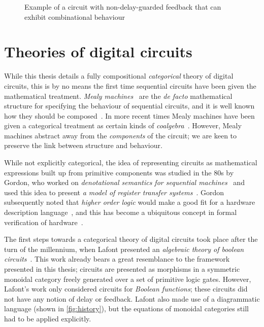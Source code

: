 \begin{figure}
    \centering
    \caption{
        Example of a circuit with non-delay-guarded feedback that can
        exhibit combinational behaviour~\cite{malik1994analysis}
    }
    \label{fig:cyclic}
\end{figure}

\section{Theories of digital circuits}

While this thesis details a fully compositional
\emph{categorical} theory of digital circuits, this is by no means the first
time sequential circuits have been given the mathematical treatment.
\emph{Mealy machines}~\cite{mealy1955method} are the \emph{de facto}
mathematical structure for specifying the behaviour of sequential circuits, and
it is well
known how they should be composed~\cite{ginzburg2014algebraic}.
In more recent times Mealy machines have been given a categorical treatment as
certain kinds of \emph{coalgebra}~\cite{rutten2006algebraic,bonsangue2008coalgebraic}.
However, Mealy machines abstract away from the \emph{components} of the circuit;
we are keen to preserve the link between structure and behaviour.

While not explicitly categorical, the idea of representing circuits as
mathematical expressions built up from primitive components was studied in the
80s by Gordon, who worked on
\emph{denotational semantics for sequential machines}~\cite{gordon1980denotational}
and used this idea to present
\emph{a model of register transfer systems}~\cite{gordon1982model}.
Gordon subsequently noted that \emph{higher order logic} would make a good fit
for a hardware description language~\cite{gordon1985why}, and this has become
a ubiquitous concept in formal verification of hardware~\cite{gupta1992formal}.

The first steps towards a categorical theory of digital circuits took place
after the turn of the millennium, when Lafont presented an
\emph{algebraic theory of boolean circuits}~\cite{lafont2003algebraic}.
This work already bears a great resemblance to the framework presented in this
thesis; circuits are presented as morphisms in a symmetric monoidal category
freely generated over a set of primitive logic gates.
However, Lafont's work only considered circuits for \emph{Boolean functions};
these circuits did not have any notion of delay or feedback.
Lafont also made use of a diagrammatic language (shown in \cref{fig:history}),
but the equations of monoidal categories still had to be applied explicitly.

